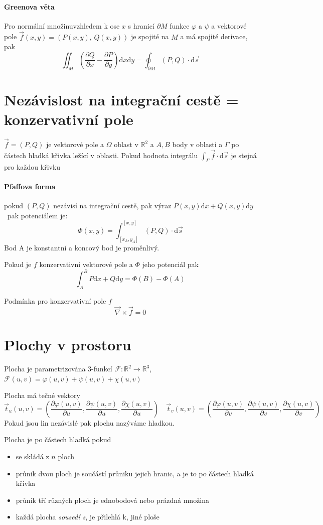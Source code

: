 \documentclass[a4paper, twoside,%
12pt]{article}
\newcommand{\dif}{\mathrm{d}}
\newcommand{\R}{\mathbb{R}}
\newcommand{\pard}[2]{\frac{\partial #1 }{\partial #2 }}
\newcommand{\F}{\mathscr{F}}
\begin{document}
\paragraph{Greenova věta} Pro normální množinuvzhledem k ose $x$ s hranicí $\partial M$ funkce $\varphi$ a $\psi$ a vektorové pole $\vec{f}(x,y)=(P(x,y),\,Q(x,y))$ je spojité na $M$ a má spojité derivace, pak 
$$\iint_M\left(\pard{Q}{x}-\pard{P}{y}\right)\dif x \dif y = \oint_{\partial M} (P,Q)\cdot \dif \vec{s}$$

\section{Nezávislost na integrační cestě = konzervativní pole}

$\vec{f}= (P,Q)$ je vektorové pole a $\Omega$ oblast v $\R^2$ a $A, B$ body v oblasti a $\Gamma$ po částech hladká křivka ležící v oblasti. Pokud hodnota integrálu $\int_\Gamma \vec{f}\cdot \dif \vec s$ je stejná pro každou křivku 

\paragraph{Pfaffova forma} pokud $(P,Q)$ nezávisí na integrační cestě, pak výraz $P(x,y) \dif x + Q(x,y) \dif y$ \ pak potenciálem je:
$$\Phi(x,y) = \int_{[x_A,y_A]}^{[x,y]}(P,Q)\cdot \dif \vec{s}$$
Bod A je konstantní a koncový bod je proměnlivý.

Pokud je $f$ konzervativní vektorové pole a $\Phi$ jeho potenciál pak 
$$\int_A^B P\dif x + Q \dif y = \Phi(B)-\Phi(A)$$

Podmínka pro konzervativní pole $f$
$$ \vec\nabla \times\vec f = 0 $$

\section{Plochy v prostoru}

Plocha je parametrizována 3-funkcí $\F : \R^2 \to \R^3$, $\F(u,v) = \varphi(u,v)+\psi(u,v)+ \chi(u,v)$

Plocha má tečné vektory 
$$ \vec t_u(u,v)=\left(\pard{\varphi(u,v)}{u}, \pard{\psi(u,v)}{u}, \pard{\chi(u,v)}{u}\right)\quad \vec t_v(u,v)=\left(\pard{\varphi(u,v)}{v}, \pard{\psi(u,v)}{v}, \pard{\chi(u,v)}{v}\right) $$
Pokud jsou lin nezávislé pak plochu nazýváme hladkou.

Plocha je po částech hladká pokud \begin{itemize}
    \item se skládá z $n$ ploch
    \item průnik dvou ploch je součástí průniku jejich hranic, a je to po částech hladká křivka
    \item průnik tří různých ploch je ednobodová nebo prázdná množina
    \item každá plocha \emph{sousedí s}, je přilehlá k, jiné ploše
\end{itemize}
\end{document}
